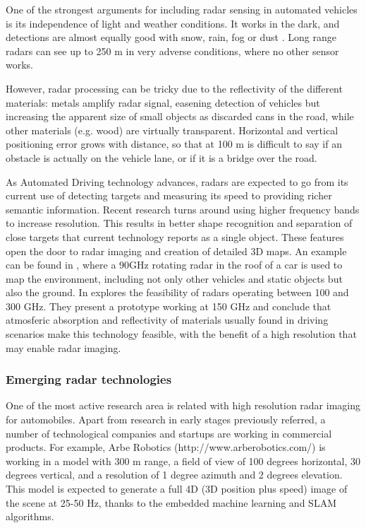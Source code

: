One of the strongest arguments for including radar sensing in automated 
vehicles is its independence of light and weather conditions. 
It works in the dark, and detections are almost equally good with snow, 
rain, fog or dust \cite{Reina2015}. Long range radars can see up to 250 m
in very adverse conditions, where no other sensor works.

However, radar processing can be tricky due to the reflectivity of the
different materials: metals amplify radar signal, easening detection of 
vehicles but increasing the apparent size of small objects as discarded cans
in the road, while other materials (e.g. wood) are virtually transparent.
Horizontal and vertical positioning error 
grows with distance, so that at 100 m is difficult to say if an obstacle is
actually on the vehicle lane, or if it is a bridge over the road.

As Automated Driving technology advances, radars are expected to go from its
current use of detecting targets and measuring its speed to providing richer
semantic information. 
Recent research turns around using higher frequency bands to increase
resolution. This results in better shape recognition and separation of close
targets that current technology reports as a single object.
These features open the door to radar imaging and creation of detailed 3D maps. 
An example can be found in \cite{Reina2015}, where a 90GHz rotating radar in
the roof of a car is used to map the environment, including not only other
vehicles and static objects but also the ground.
In \cite{Kohler2013} explores the feasibility of radars operating between 
100 and 300 GHz. They present a prototype working at 150 GHz and conclude 
that atmosferic absorption and reflectivity of materials usually found in 
driving scenarios make this technology feasible, with the benefit of a high
resolution that may enable radar imaging.


\subsubsection{Emerging radar technologies}

One of the most active research area is related with high resolution radar
imaging for automobiles. Apart from research in early stages previously 
referred, a number of technological companies and startups are working in 
commercial products. 
For example, Arbe Robotics (http://www.arberobotics.com/) is working in a 
model with 300 m range, a field of view of 100 degrees horizontal, 30 degrees
vertical, and a resolution of 1 degree azimuth and 2 degrees elevation. 
This model is expected to generate a full 4D (3D position plus speed) image of
the scene at 25-50 Hz, thanks to the embedded machine learning and SLAM
algorithms.


